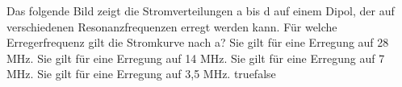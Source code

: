     {Das folgende Bild zeigt die Stromverteilungen a bis d auf einem Dipol, der auf verschiedenen Resonanzfrequenzen erregt werden kann. Für welche Erregerfrequenz gilt die Stromkurve nach a?}
    {Sie gilt für eine Erregung auf 28 MHz.}
    {Sie gilt für eine Erregung auf 14 MHz.}
    {Sie gilt für eine Erregung auf 7 MHz.}
    {Sie gilt für eine Erregung auf 3,5 MHz.}
    {true}{false}
